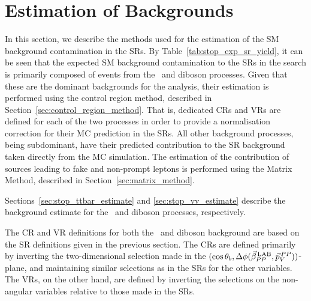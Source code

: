 \section{Estimation of Backgrounds}
\label{sec:stop_background_estimate}

In this section, we describe the methods used for the estimation of the SM background
contamination in the SRs.
By Table~\ref{tab:stop_exp_sr_yield}, it can be seen that the expected SM background
contamination to the SRs in the \bWN search is primarily composed of events
from the \ttbar~and diboson processes.
Given that these are the dominant backgrounds for the analysis, their estimation is performed
using the control region method, described in Section~\ref{sec:control_region_method}.
That is, dedicated CRs and VRs are defined for each of the two processes in order
to provide a normalisation correction for their MC prediction in the SRs.
All other background processes, being subdominant, have their predicted contribution
to the SR background taken directly from the MC simulation.
The estimation of the contribution of sources leading to fake and non-prompt leptons
is performed using the Matrix Method, described in Section~\ref{sec:matrix_method}.

Sections~\ref{sec:stop_ttbar_estimate} and \ref{sec:stop_vv_estimate} describe
the background estimate for the \ttbar~and diboson processes, respectively.


The CR and VR definitions for both the \ttbar~and diboson background are based on the
SR definitions given in the previous section.
The CRs are defined primarily by inverting the two-dimensional selection
made in the $(\cos\theta_b, \Delta \phi (\vec{\beta}_{PP}^{\,\text{LAB}}, \vec{p}_V^{\,PP}))$-plane, and maintaining similar selections as in the SRs for the other variables.
The VRs, on the other hand, are defined by inverting the selections on the non-angular variables relative to those
made in the SRs.

